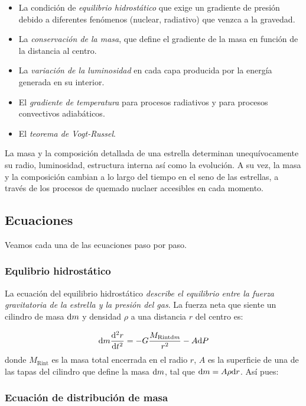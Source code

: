\begin{itemize}
	\item La condición de \textit{equilibrio hidrostático} que exige un gradiente de presión debido a diferentes fenómenos (nuclear, radiativo) que venzca a la gravedad.
	\item La \textit{conservación de la masa}, que define el gradiente de la masa en función de la distancia al centro.
	\item La \textit{variación de la luminosidad} en cada capa producida por la energía generada en su interior.
	\item El \textit{gradiente de temperatura} para procesos radiativos y para procesos convectivos adiabáticos.
	\item El \textit{teorema de Vogt-Russel}.
\end{itemize}
La masa y la composición detallada de una estrella determinan unequívocamente su radio, luminosidad, estructura interna así como la evolución. A su vez, la masa y la composición cambian a lo largo del tiempo en el seno de las estrellas, a través de los procesos de quemado nuclaer accesibles en cada momento.

\subsection{Ecuaciones}

Veamos cada una de las ecuaciones paso por paso.

\subsubsection{Equlibrio hidrostático}

La ecuación del equilibrio hidrostático \textit{describe el equilibrio entre la fuerza gravitatoria de la estrella y la presión del gas}. La fuerza neta que siente un cilindro de masa $\mathrm{d} m$ y densidad $\rho$ a una distancia $r$ del centro es:

\begin{equation}
	\mathrm{d} m \frac{\mathrm{d} ^2 r}{\mathrm{d} t^2} = - G \frac{M_{\text{Rint} \mathrm{d} m}}{r^2} - A \mathrm{d} P
\end{equation}
donde  $M_{\text{Rint}}$ es la masa total encerrada en el radio $r$, $A$  es la superficie de una de las tapas del cilindro que define la masa $\mathrm{d} m$, tal que $\mathrm{d} m = A \rho \mathrm{d} r$. Así pues:


\subsubsection{Ecuación de distribución de masa }

